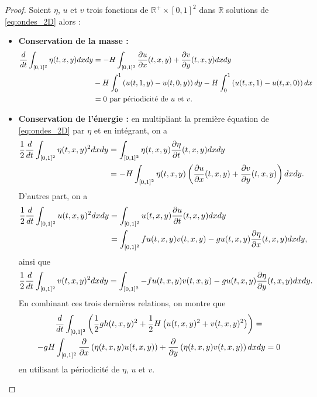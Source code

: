\begin{proof}
Soient $\eta$, $u$ et $v$ trois fonctions de $\mathbb{R}^+ \times [0,1]^2$ dans $\mathbb{R}$ solutions de \eqref{eq:ondes_2D} alors :
\begin{itemize}
\item \textbf{Conservation de la masse :}
\begin{align*}
\dfrac{d}{dt} \displaystyle\int_{[0,1]^2} \eta(t,x,y)dxdy & = - H \displaystyle\int_{[0,1]^2} \dfrac{\partial u}{\partial x}(t,x,y) + \dfrac{\partial v}{\partial y}(t,x,y) dx dy \\
	& - H \displaystyle\int_0^1 \left( u(t,1,y) - u(t,0,y) \right)dy  - H \displaystyle\int_0^1 \left( u(t,x,1) - u(t,x,0) \right)dx \\
	& = 0 \text{ par périodicité de } u \text{ et } v. 
\end{align*}

\item \textbf{Conservation de l'énergie :} en multipliant la première équation de \eqref{eq:ondes_2D} par $\eta$ et en intégrant, on a 
\begin{align*}
\dfrac{1}{2} \dfrac{d}{dt} \displaystyle\int_{[0,1]^2} \eta(t,x,y)^2 dx dy & = \displaystyle\int_{[0,1]^2} \eta(t,x,y) \dfrac{\partial \eta}{\partial t}(t,x,y) dx dy \\
	& = - H \displaystyle\int_{[0,1]^2} \eta(t,x,y) \left( \dfrac{\partial u}{\partial x}(t,x,y) + \dfrac{\partial v}{\partial y}(t,x,y) \right) dx dy.
\end{align*}
D'autres part, on a 
\begin{align*}
\dfrac{1}{2} \dfrac{d}{dt} \displaystyle\int_{[0,1]^2} u(t,x,y)^2 dx dy & = \displaystyle\int_{[0,1]^2} u(t,x,y) \dfrac{\partial u}{\partial t}(t,x,y) dx dy \\
& = \displaystyle\int_{[0,1]^2} f u(t,x,y) v(t,x,y) - g u(t,x,y) \dfrac{\partial \eta}{\partial x}(t,x,y) dx dy,
\end{align*}
ainsi que 
\begin{equation*}
\dfrac{1}{2} \dfrac{d}{dt} \displaystyle\int_{[0,1]^2} v(t,x,y)^2 dx dy =  \displaystyle\int_{[0,1]^2}  - f u(t,x,y) v(t,x,y) - g u(t,x,y) \dfrac{\partial \eta}{\partial y}(t,x,y) dx dy.
\end{equation*}
En combinant ces trois dernières relations, on montre que
\begin{multline*}
\dfrac{d}{dt} \displaystyle\int_{[0,1]^2} \left( \dfrac{1}{2} g h(t,x,y)^2 + \dfrac{1}{2} H \left( u(t,x,y)^2 + v(t,x,y)^2 \right) \right) = \\
- g H \displaystyle\int_{[0,1]^2} \dfrac{\partial}{\partial x} \left( \eta(t,x,y) u (t,x,y) \right) +  \dfrac{\partial}{\partial y} \left( \eta(t,x,y) v (t,x,y) \right) dx dy
= 0
\end{multline*}
en utilisant la périodicité de $\eta$, $u$ et $v$.
\end{itemize}
\end{proof}







